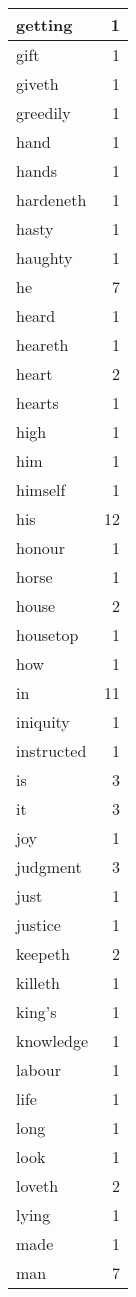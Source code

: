 \begin{center}
\begin{longtable}{l|r}
getting & 1\\ \hline 
gift & 1\\ \hline 
giveth & 1\\ \hline 
greedily & 1\\ \hline 
hand & 1\\ \hline 
hands & 1\\ \hline 
hardeneth & 1\\ \hline 
hasty & 1\\ \hline 
haughty & 1\\ \hline 
he & 7\\ \hline 
heard & 1\\ \hline 
heareth & 1\\ \hline 
heart & 2\\ \hline 
hearts & 1\\ \hline 
high & 1\\ \hline 
him & 1\\ \hline 
himself & 1\\ \hline 
his & 12\\ \hline 
honour & 1\\ \hline 
horse & 1\\ \hline 
house & 2\\ \hline 
housetop & 1\\ \hline 
how & 1\\ \hline 
in & 11\\ \hline 
iniquity & 1\\ \hline 
instructed & 1\\ \hline 
is & 3\\ \hline 
it & 3\\ \hline 
joy & 1\\ \hline 
judgment & 3\\ \hline 
just & 1\\ \hline 
justice & 1\\ \hline 
keepeth & 2\\ \hline 
killeth & 1\\ \hline 
king's & 1\\ \hline 
knowledge & 1\\ \hline 
labour & 1\\ \hline 
life & 1\\ \hline 
long & 1\\ \hline 
look & 1\\ \hline 
loveth & 2\\ \hline 
lying & 1\\ \hline 
made & 1\\ \hline 
man & 7\\ \hline 

\end{longtable}
\end{center}
